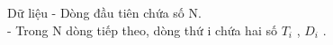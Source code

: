 Dữ liệu
- Dòng đầu tiên chứa số N.   
\\   - Trong N dòng tiếp theo, dòng thứ i chứa hai số $T_{i}$   , $D_{i}$   .